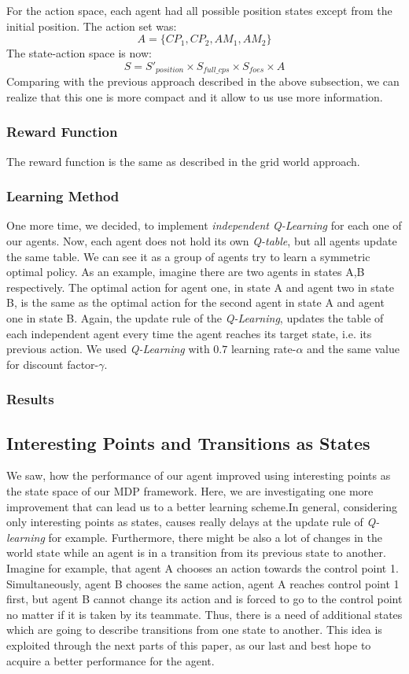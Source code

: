 \documentclass[conference]{IEEEtran}
\begin{document}
For the action space, each agent had all possible position states except from the initial position.
The action set was:
\begin{equation}
A = \lbrace CP_1, CP_2, AM_1, AM_2 \rbrace
\end{equation}
The state-action space is now:
\begin{equation}
S = S'_{position} \times S_{full\_cps} \times S_{foes} \times A
\end{equation}
Comparing with the previous approach described in the above subsection, we can realize that this one is more compact and it allow to us use more information.
\subsubsection{Reward Function}
The reward function is the same as described in the grid world approach.
\subsubsection{Learning Method}
One more time, we decided, to implement \textit{independent Q-Learning} for each one of our agents. Now, each agent does not hold its own \textit{Q-table}, but all agents update the same table. We can see it as a group of agents try to learn a symmetric optimal policy. As an example, imagine there are two agents in states A,B respectively. The optimal action for agent one, in state A and agent two in state B, is the same as the optimal action for the second agent in state A and agent one in state B. Again, the update rule of the \textit{Q-Learning}, updates the table of each independent agent every time the agent reaches its target state, i.e. its previous action. We used \textit{Q-Learning} with $0.7$ learning rate-$\alpha$ and the same value for discount factor-$\gamma$.
\subsubsection{Results}


\subsection{Interesting Points and Transitions as States}
We saw, how the performance of our agent improved using interesting points as the state space of our MDP framework. Here, we are investigating one more improvement that can lead us to a better learning scheme.In general, considering only interesting points as states, causes really delays at the update rule of \textit{Q-learning} for example. Furthermore, there might be also a lot of changes in the world state while an agent is in a transition from its previous state to another. Imagine for example, that agent A chooses an action towards the control point 1. Simultaneously, agent B chooses the same action, agent A reaches control point 1 first, but agent B cannot change its action and is forced to go to the control point no matter if it is taken by its teammate. Thus, there is a need of additional states which are going to describe transitions from one state to another. This idea is exploited through the next parts of this paper, as our last and best hope to acquire a better performance for the agent.
\end{document}
